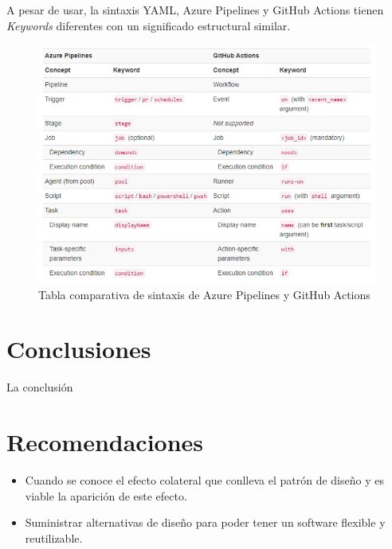 \documentclass[twoside,twocolumn]{article}
\begin{document}
A pesar de usar, la sintaxis YAML, Azure Pipelines y GitHub Actions tienen \textit{Keywords} diferentes con un significado estructural similar.

\begin{figure}[t]
    \begin{center}
        \includegraphics[width = \columnwidth]{./Imagenes/1 iwr4M9D-eSbMV8ki5xbU2w.png}
        \caption{Tabla comparativa de sintaxis de Azure Pipelines y GitHub Actions}
    \end{center}
\end{figure}


\newpage

\section{Conclusiones}

La conclusión 

\section{Recomendaciones}


\begin{itemize}
\item Cuando se conoce el efecto colateral que conlleva el patrón de diseño y es viable la aparición de este efecto.
\item Suministrar alternativas de diseño para poder tener un software flexible y reutilizable.

\end{itemize}
\end{document}
